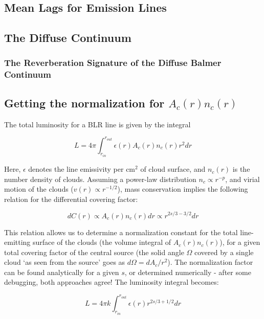 \documentclass[paper=a4, fontsize=11pt]{scrartcl} %
\numberwithin{equation}{section} %
\numberwithin{figure}{section} %
\numberwithin{table}{section} %
\begin{document}
\subsection{Mean Lags for Emission Lines}

\subsection{The Diffuse Continuum}

\subsubsection{The Reverberation Signature of the Diffuse Balmer Continuum}



\subsection{Getting the normalization for $A_c(r)n_c(r)$}

The total luminosity for a BLR line is given by the integral

\begin{equation*}
L=4\pi\int_{r_{in}}^{r_{out}}\epsilon(r)A_c(r)n_c(r)r^2dr
\end{equation*}

Here, $\epsilon$ denotes the line emissivity per cm$^2$ of cloud surface, and $n_c(r)$ is the number density of clouds. Assuming a power-law distribution $n_c\propto r^{-p}$, and virial motion of the clouds ($v(r)\propto r^{-1/2}$), mass conservation implies the following relation for the differential covering factor:

\begin{equation*}
dC(r) \propto A_c(r)n_c(r) dr \propto r^{2s/3-3/2} dr
\end{equation*}

This relation allows us to determine a normalization constant for the total line-emitting surface of the clouds (the volume integral of $A_c(r)n_c(r)$), for a given total covering factor of the central source (the solid angle $\Omega$ covered by a single cloud `as seen from the source' goes as $d\Omega=dA_c/r^2$). The normalization factor can be found analytically for a given $s$, or determined numerically - after some debugging, both approaches agree! The luminosity integral becomes:

\begin{equation*}
L=4\pi k\int_{r_{in}}^{r_{out}}\epsilon(r)r^{2s/3+1/2}dr
\end{equation*}
\end{document}
